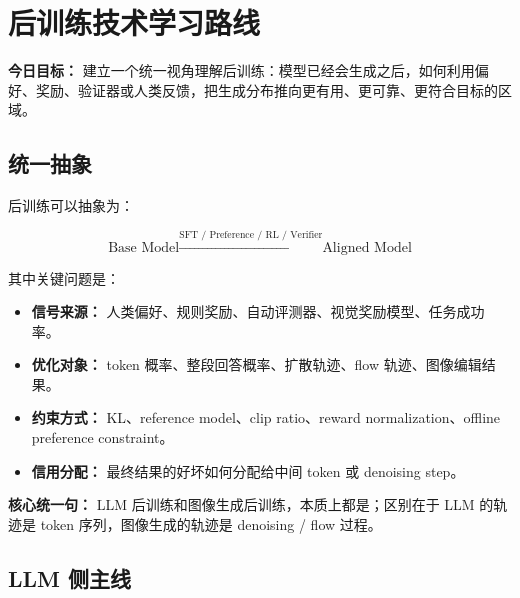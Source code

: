 
\section{后训练技术学习路线}

\begin{conceptbox}
\textbf{今日目标：} 建立一个统一视角理解后训练：模型已经会生成之后，如何利用偏好、奖励、验证器或人类反馈，把生成分布推向更有用、更可靠、更符合目标的区域。
\end{conceptbox}

\subsection{统一抽象}

后训练可以抽象为：

\[
\text{Base Model} \xrightarrow{\text{SFT / Preference / RL / Verifier}} \text{Aligned Model}
\]

其中关键问题是：

\begin{itemize}[leftmargin=1.5em]
  \item \textbf{信号来源：} 人类偏好、规则奖励、自动评测器、视觉奖励模型、任务成功率。
  \item \textbf{优化对象：} token 概率、整段回答概率、扩散轨迹、flow 轨迹、图像编辑结果。
  \item \textbf{约束方式：} KL、reference model、clip ratio、reward normalization、offline preference constraint。
  \item \textbf{信用分配：} 最终结果的好坏如何分配给中间 token 或 denoising step。
\end{itemize}

\begin{summarybox}
\textbf{核心统一句：} LLM 后训练和图像生成后训练，本质上都是；区别在于 LLM 的轨迹是 token 序列，图像生成的轨迹是 denoising / flow 过程。
\end{summarybox}

\subsection{LLM 侧主线}

